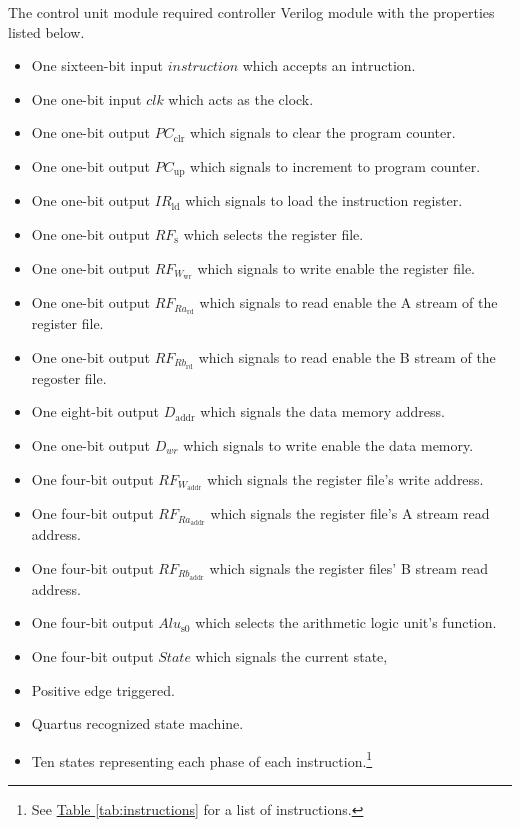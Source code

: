 The control unit module required controller Verilog module with the properties listed below.

\begin{itemize}
    \item One sixteen-bit input $instruction$ which accepts an intruction.
    \item One one-bit input $clk$ which acts as the clock.
    \item One one-bit output $PC_\text{clr}$ which signals to clear the program counter.
    \item One one-bit output $PC_\text{up}$ which signals to increment to program counter.
    \item One one-bit output $IR_\text{ld}$ which signals to load the instruction register.
    \item One one-bit output $RF_\text{s}$ which selects the register file.
    \item One one-bit output $RF_{W_\text{wr}}$ which signals to write enable the register file.
    \item One one-bit output $RF_{Ra_\text{rd}}$ which signals to read enable the A stream of the register file.
    \item One one-bit output $RF_{Rb_\text{rd}}$ which signals to read enable the B stream of the regoster file.
    \item One eight-bit output $D_\text{addr}$ which signals the data memory address.
    \item One one-bit output $D_{wr}$ which signals to write enable the data memory.
    \item One four-bit output $RF_{W_\text{addr}}$ which signals the register file's write address.
    \item One four-bit output $RF_{Ra_\text{addr}}$ which signals the register file's A stream read address.
    \item One four-bit output $RF_{Rb_\text{addr}}$ which signals the register files' B stream read address.
    \item One four-bit output $Alu_\text{s0}$ which selects the arithmetic logic unit's function.
    \item One four-bit output $State$ which signals the current state,
    \item Positive edge triggered.
    \item Quartus recognized state machine.
    \item Ten states representing each phase of each instruction.\footnote{See \hyperref[tab:instructions]{Table \ref*{tab:instructions}} for a list of instructions.}

\end{itemize}

